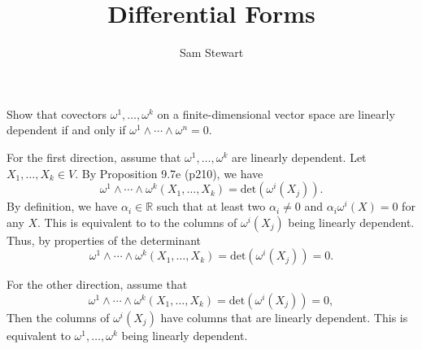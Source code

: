 \documentclass[12pt,letterpaper,boxed]{jhwhw}
\author{Sam Stewart}
\title{Differential Forms}
\newcommand{\R}{{\mathbb{R}}}
\begin{document}


Show that covectors $\omega^1, \ldots, \omega^k$ on a finite-dimensional vector space are linearly dependent if and only if $\omega^1 \wedge \cdots \wedge \omega^n = 0$.

\solution
For the first direction, assume that $\omega^1, \ldots, \omega^k$ are linearly dependent. Let $X_1, \ldots, X_k \in V$. By Proposition 9.7e (p210), we have
\[
	\omega^1 \wedge \cdots \wedge \omega^k(X_1, \ldots, X_k) = \textrm{det}\left( \omega^i \left( X_j \right) \right).
\]
By definition, we have $\alpha_i \in \R$ such that at least two $\alpha_i \neq 0$ and $\alpha_i \omega^i(X) = 0$ for any $X$. This is equivalent to to the columns of $\omega^i \left( X_j \right)$ being linearly dependent. Thus, by properties of the determinant
\[
	\omega^1 \wedge \cdots \wedge \omega^k(X_1, \ldots, X_k) =  \textrm{det}\left( \omega^i \left( X_j \right) \right) = 0.
\]

For the other direction, assume that
\[
	\omega^1 \wedge \cdots \wedge \omega^k(X_1, \ldots, X_k) =  \textrm{det}\left( \omega^i \left( X_j \right) \right) = 0,
\]
Then the columns of $\omega^i \left( X_j \right)$ have columns that are linearly dependent. This is equivalent to $\omega^1, \ldots, \omega^k$ being linearly dependent.
\end{document}
